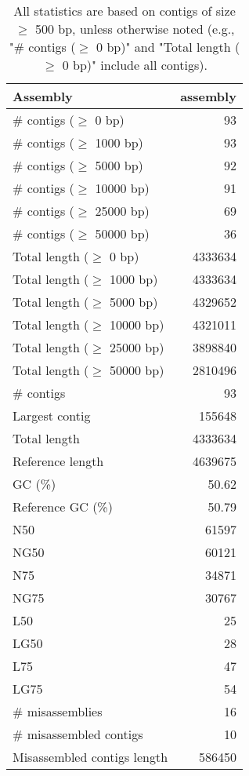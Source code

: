 \documentclass[12pt,a4paper]{article}
\begin{document}
\begin{table}[ht]
\begin{center}
\caption{All statistics are based on contigs of size $\geq$ 500 bp, unless otherwise noted (e.g., "\# contigs ($\geq$ 0 bp)" and "Total length ($\geq$ 0 bp)" include all contigs).}
\begin{tabular}{|l*{1}{|r}|}
\hline
Assembly & assembly \\ \hline
\# contigs ($\geq$ 0 bp) & 93 \\ \hline
\# contigs ($\geq$ 1000 bp) & 93 \\ \hline
\# contigs ($\geq$ 5000 bp) & 92 \\ \hline
\# contigs ($\geq$ 10000 bp) & 91 \\ \hline
\# contigs ($\geq$ 25000 bp) & 69 \\ \hline
\# contigs ($\geq$ 50000 bp) & 36 \\ \hline
Total length ($\geq$ 0 bp) & 4333634 \\ \hline
Total length ($\geq$ 1000 bp) & 4333634 \\ \hline
Total length ($\geq$ 5000 bp) & 4329652 \\ \hline
Total length ($\geq$ 10000 bp) & 4321011 \\ \hline
Total length ($\geq$ 25000 bp) & 3898840 \\ \hline
Total length ($\geq$ 50000 bp) & 2810496 \\ \hline
\# contigs & 93 \\ \hline
Largest contig & 155648 \\ \hline
Total length & 4333634 \\ \hline
Reference length & 4639675 \\ \hline
GC (\%) & 50.62 \\ \hline
Reference GC (\%) & 50.79 \\ \hline
N50 & 61597 \\ \hline
NG50 & 60121 \\ \hline
N75 & 34871 \\ \hline
NG75 & 30767 \\ \hline
L50 & 25 \\ \hline
LG50 & 28 \\ \hline
L75 & 47 \\ \hline
LG75 & 54 \\ \hline
\# misassemblies & 16 \\ \hline
\# misassembled contigs & 10 \\ \hline
Misassembled contigs length & 586450 \\ \hline

\end{tabular}
\end{center}
\end{table}
\end{document}
